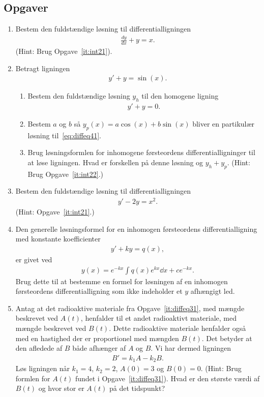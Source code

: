 \subsection{Opgaver}
\begin{enumerate}
	
	
	
	\item Bestem den fuldstændige løsning til differentialligningen 
	\begin{align*}
	\frac{dy}{dx}+y=x.
	\end{align*}
	(Hint: Brug Opgave~\ref{it:int21}).
	
	\item Betragt ligningen 
	\begin{align}\label{eq:diffeq41}
	y'+y=\sin(x).
	\end{align}
	\begin{enumerate}
		\item Bestem den fuldstændige løsning $y_h$ til den homogene ligning
		\begin{align*}
		y'+y=0.
		\end{align*}
		\item Bestem $a$ og $b$ så $y_p(x)=a\cos(x)+b\sin(x)$ bliver en partikulær løsning til~\eqref{eq:diffeq41}. 
		\item Brug løsningsformlen for inhomogene førsteordens differentialligninger til at løse ligningen. Hvad er forskellen på denne løsning og $y_h+y_p$. (Hint: Brug Opgave~\ref{it:int22}.)
	\end{enumerate}

	\item Bestem den fuldstændige løsning til differentialligningen 
	\begin{align*}
	y'-2y=x^2.
	\end{align*}
	(Hint: Opgave~\ref{it:int21}.)
	
	\item Den generelle løsningsformel for en inhomogen førsteordens differentialligning med konstante koefficienter
	\begin{align*}
	y'+ky=q(x),
	\end{align*}
	er givet ved
	\begin{align*}
	y(x)=e^{-kx}\int q(x)e^{kx}\dd x+ ce^{-kx}.
	\end{align*}
	Brug dette til at bestemme en formel for løsningen af en inhomogen førsteordens differentialligning som ikke indeholder et $y$ afhængigt led.
	
	
	
	\item Antag at det radioaktive materiale fra Opgave~\ref{it:diffeq31}, med mængde beskrevet ved $A(t)$, henfalder til et andet radioaktivt materiale, med mængde beskrevet ved $B(t)$. Dette radioaktive materiale henfalder også med en hastighed der er proportionel med mængden $B(t)$. Det betyder at den afledede af $B$ både afhænger af $A$ og $B$. Vi har dermed ligningen
	\begin{align*}
	B'=k_1 A-k_2 B.
	\end{align*} 
	Løs ligningen når $k_1=4$, $k_2=2$, $A(0)=3$ og $B(0)=0$. (Hint: Brug formlen for $A(t)$ fundet i Opgave~\ref{it:diffeq31}). Hvad er den største værdi af $B(t)$ og hvor stor er $A(t)$ på det tidspunkt?
	

\end{enumerate}
